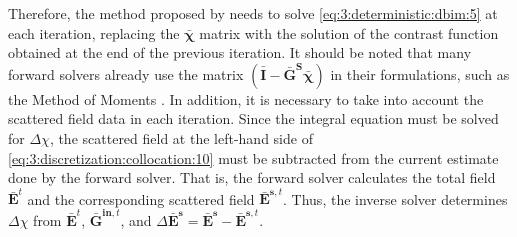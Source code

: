 			Therefore, the method proposed by \cite{chew1990reconstruction} needs to solve \eqref{eq:3:deterministic:dbim:5} at each iteration, replacing the $\boldsymbol{\bar{\chi}}$ matrix with the solution of the contrast function obtained at the end of the previous iteration. It should be noted that many forward solvers already use the matrix $(\mathbf{\bar{I}} - \mathbf{\bar{G}^S}\boldsymbol{\bar{\chi}})$ in their formulations, such as the Method of Moments \citep{richmond1965scattering}. In addition, it is necessary to take into account the scattered field data in each iteration. Since the integral equation must be solved for $\Delta\chi$, the scattered field at the left-hand side of \eqref{eq:3:discretization:collocation:10} must be subtracted from the current estimate done by the forward solver. That is, the forward solver calculates the total field $\mathbf{\bar{E}}^t$ and the corresponding scattered field $\mathbf{\bar{E}}^{\mathbf{s},t}$. Thus, the inverse solver determines $\Delta\chi$ from $\mathbf{\bar{E}}^t$, $\mathbf{\bar{G}}^{\mathbf{in},t}$, and $\Delta\mathbf{\bar{E}^s} = \mathbf{\bar{E}^s} - \mathbf{\bar{E}}^{\mathbf{s},t}$.
			
